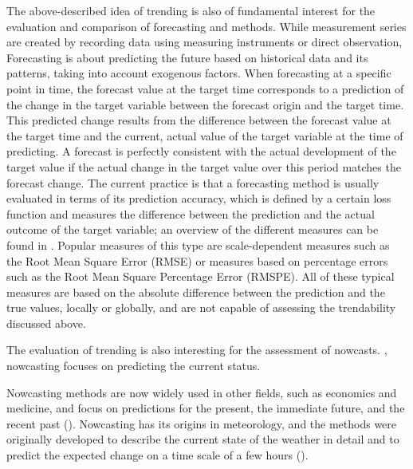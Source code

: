 The above-described idea of trending is also of fundamental interest for the evaluation and comparison of forecasting and methods. 
While measurement series are created by recording data using measuring instruments or direct observation, Forecasting is about predicting the future based on historical data and its patterns, taking into account exogenous factors. 
When forecasting at a specific point in time, the forecast value at the target time corresponds to a prediction of the change in the target variable between the forecast origin and the target time. 
This predicted change results from the difference between the forecast value at the target time and the current, actual value of the target variable at the time of predicting. 
A forecast is perfectly consistent with the actual development of the target value if the actual change in the target value over this period matches the forecast change. 
The current practice is that a forecasting method is usually evaluated in terms of its prediction accuracy, which is defined by a certain loss function and measures the difference between the prediction and the actual outcome of the target variable; an overview of the different measures can be found in \cite{hyndman2006another}. 
Popular measures of this type are scale-dependent measures such as the Root Mean Square Error (RMSE) or measures based on percentage errors such as the Root Mean Square Percentage Error (RMSPE). 
All of these typical measures are based on the absolute difference between the prediction and the true values, locally or globally, and are not capable of assessing the trendability discussed above.

The evaluation of trending is also interesting for the assessment of nowcasts.
, nowcasting focuses on predicting the current status.

Nowcasting methods are now widely used in other fields, such as economics and medicine, and focus on predictions for the present, the immediate future, and the recent past (\cite{banbura2013now, bok2018macroeconomic, wolffram2023collaborative}).
Nowcasting has its origins in meteorology, and the methods were originally developed to describe the current state of the weather in detail and to predict the expected change on a time scale of a few hours (\cite{browning1989nowcasting,schmid2019nowcasting}).

